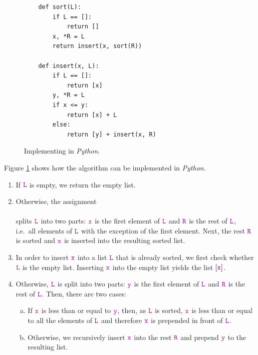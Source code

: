 \begin{figure}[!ht]
  \centering
\begin{verbatim}
    def sort(L):
        if L == []:
            return []
        x, *R = L
        return insert(x, sort(R))
        
    def insert(x, L):
        if L == []:
            return [x]
        y, *R = L
        if x <= y:
            return [x] + L
        else:
            return [y] + insert(x, R)
\end{verbatim}
\vspace*{-0.3cm}
  \caption{Implementing  in \textsl{Python}.}
  \label{fig:Insertion-Sort.ipynb}
\end{figure} 

\noindent
Figure \ref{fig:Insertion-Sort.ipynb} shows how the  algorithm can be implemented 
in \textsl{Python}.
\begin{enumerate}
\item If $\mytt{L}$ is empty, we return the empty list.
\item Otherwise, the assignment
      \\[0.2cm]
      \hspace*{1.3cm}
      \\[0.2cm]
      splits $\mytt{L}$ into two parts: $\mytt{x}$ is the first element of $\mytt{L}$ and $\mytt{R}$ is the rest of $\mytt{L}$,
      i.e.~all elements of $\mytt{L}$ with the exception of the first element.  Next, the rest $\mytt{R}$
      is sorted and $\mytt{x}$ is inserted into the resulting sorted list.
\item In order to insert $\mytt{x}$ into a list $\mytt{L}$ that is already sorted, we first check whether
      $\mytt{L}$ is the empty list.  Inserting $\mytt{x}$ into the empty list yields the list $[\mytt{x}]$.
\item Otherwise, $\mytt{L}$ is split into two parts: $\mytt{y}$ is the first element of $\mytt{L}$ and
      $\mytt{R}$ is the rest of $\mytt{L}$. 
      Then, there are two cases:
      \begin{enumerate}[(a)]
      \item If $\mytt{x}$ is less than or equal to $\mytt{y}$, then, as $\mytt{L}$ is sorted,  $\mytt{x}$
            is less than or equal to all the elements of $\mytt{L}$ and therefore $\mytt{x}$ is prepended in front
            of $\mytt{L}$. 
      \item Otherwise, we recursively insert $\mytt{x}$ into the rest $\mytt{R}$ and prepend $\mytt{y}$
            to the resulting list.     
      \end{enumerate}
\end{enumerate}

